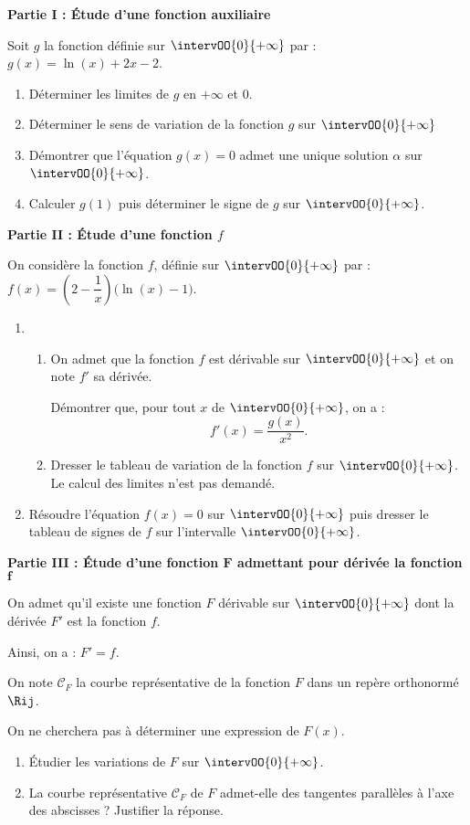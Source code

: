 \textbf{Partie I : Étude d’une fonction auxiliaire}

\medskip

Soit $g$ la fonction définie sur $\intervOO{0}{+\infty}$ par : $g(x)=\ln(x)+2x-2$.

\begin{enumerate}
	\item Déterminer les limites de $g$ en $+\infty$ et $0$. 
	\item Déterminer le sens de variation de la fonction $g$ sur $\intervOO{0}{+\infty}$
	\item Démontrer que l'équation $g(x)=0$ admet une unique solution $\alpha$ sur $\intervOO{0}{+\infty}$. 
	\item Calculer $g(1)$ puis déterminer le signe de $g$ sur $\intervOO{0}{+\infty}$.
\end{enumerate}

\textbf{Partie II : Étude d'une fonction \boldmath$f$\unboldmath}

\medskip

On considère la fonction $f$, définie sur $\intervOO{0}{+\infty}$ par : $f(x)=\left(2-\dfrac{1}{x}\right)\big(\ln(x)-1\big)$.

\begin{enumerate}
	\item 
	\begin{enumerate}
		\item On admet que la fonction $f$ est dérivable sur $\intervOO{0}{+\infty}$ et on note $f'$ sa dérivée.
		
		Démontrer que, pour tout $x$ de $\intervOO{0}{+\infty}$, on a : \[f'(x)=\dfrac{g(x)}{x^2}.\]
		\item Dresser le tableau de variation de la fonction $f$ sur $\intervOO{0}{+\infty}$. Le calcul des limites n’est pas demandé.
	\end{enumerate}
	\item Résoudre l'équation $f(x)=0$ sur $\intervOO{0}{+\infty}$ puis dresser le tableau de signes de $f$ sur l’intervalle $\intervOO{0}{+\infty}$. 
\end{enumerate}

\textbf{Partie III : Étude d’une fonction $\bm{F}$ admettant pour dérivée la fonction $\bm{f}$}

\medskip

On admet qu’il existe une fonction $F$ dérivable sur $\intervOO{0}{+\infty}$ dont la dérivée $F'$ est la fonction $f$.

Ainsi, on a : $F'=f$.

\smallskip

On note $\mathcal{C}_F$ la courbe représentative de la fonction $F$ dans un repère orthonormé $\Rij$.

\smallskip

On ne cherchera pas à déterminer une expression de $F(x)$.

\begin{enumerate}
	\item Étudier les variations de $F$ sur $\intervOO{0}{+\infty}$.
	\item La courbe représentative $\mathcal{C}_F$ de $F$ admet-elle des tangentes parallèles à l’axe des abscisses ? Justifier la réponse.
\end{enumerate}